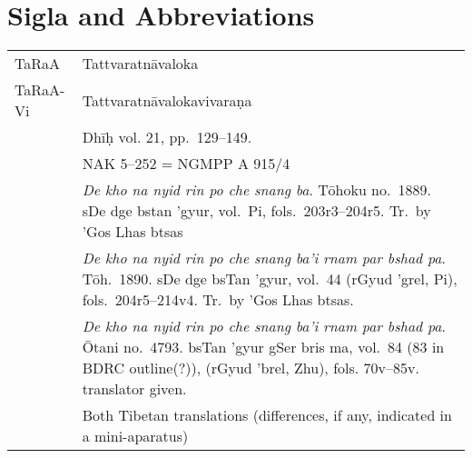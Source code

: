\documentclass[12pt]{article}
\begin{document}
\section*{Sigla and Abbreviations}
\noindent\begin{longtable}{ l p{12cm} }
	\noindent TaRaA & Tattvaratnāvaloka\\

	\noindent TaRaA-Vi & Tattvaratnāvalokavivaraṇa\\

	\noindent \EDD\ & Dhīḥ vol. 21, pp.\ 129–149.\\

	\noindent \MS\ & NAK 5–252 = NGMPP A 915/4\\

	\noindent \TM & \emph{De kho na nyid rin po che snang ba}. Tōhoku no.\ 1889. sDe dge bstan 'gyur, vol.\ Pi, fols.\ 203r3–204r5. Tr.\ by 'Gos Lhas btsas\\

	\noindent \TVA & \emph{De kho na nyid rin po che snang ba'i rnam par bshad pa}.  Tōh.\ 1890. sDe dge bsTan 'gyur, vol.\ 44 (rGyud 'grel, Pi), fols.\ 204r5–214v4. Tr.\ by 'Gos Lhas btsas.\\

	\noindent \TVB & \emph{De kho na nyid rin po che snang ba'i rnam par bshad pa}. Ōtani no.\ 4793. bsTan 'gyur gSer bris ma, vol.\ 84 (83 in BDRC outline(?)), (rGyud 'brel, Zhu), fols. 70v–85v. translator given.\\

	\noindent \TIB & Both Tibetan translations (differences, if any, indicated in a mini-aparatus)\\


\end{longtable}
\end{document}
